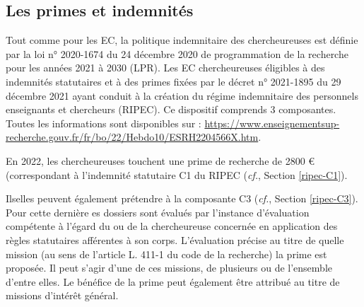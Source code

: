 \begin{center}
\begin{table}[t!]
\begin{center}
\caption{Grilles d'avancement des DR INRAE}\label{tab.avanc.DRINRAE}
\end{center}
\end{table}
\end{center}

\subsection{Les primes et indemnit\'es}

Tout comme pour les EC, la politique indemnitaire des chercheur\mp euse\mp s est d\'efinie par la loi n° 2020-1674 du 24 d\'ecembre 2020 de programmation de la recherche pour les ann\'ees 2021 \`a 2030 (LPR). Les EC chercheur\mp euse\mp s \'eligibles \`a des indemnit\'es statutaires et \`a des primes fix\'ees par le d\'ecret n° 2021-1895 du 29 d\'ecembre 2021 ayant conduit \`a la cr\'eation du r\'egime indemnitaire des personnels enseignants et chercheurs (RIPEC). Ce dispositif comprends 3 composantes. Toutes les informations sont disponibles sur : \url{https://www.enseignementsup-recherche.gouv.fr/fr/bo/22/Hebdo10/ESRH2204566X.htm}.

En 2022, les chercheur\mp euse\mp s touchent une prime de recherche de 2800 \euro (correspondant \`a l'indemnit\'e statutaire C1 du RIPEC ({\em cf.}, Section \ref{ripec-C1}). 

Ils\mp elles peuvent \'egalement pr\'etendre \`a la composante C3 ({\em cf.}, Section \ref{ripec-C3}). Pour cette derni\`ere es dossiers sont \'evalu\'es par l'instance d'\'evaluation comp\'etente \`a l'\'egard du ou de la chercheur\mp euse concern\'e\mp e en application des r\`egles statutaires aff\'erentes \`a son corps. L'\'evaluation pr\'ecise au titre de quelle mission (au sens de l'article L. 411-1 du code de la recherche) la prime est propos\'ee. Il peut s'agir d'une de ces missions, de plusieurs ou de l'ensemble d'entre elles. Le b\'en\'efice de la prime peut \'egalement \^etre attribu\'e au titre de missions d'int\'er\^et g\'en\'eral. 

